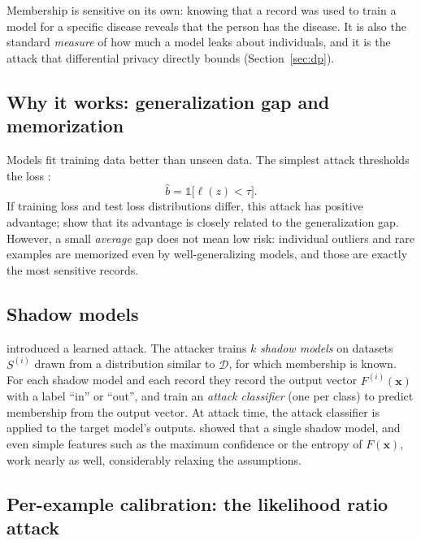 \documentclass[10pt,a4paper]{extarticle}
\theoremstyle{definition}
\newcommand{\D}{\mathcal{D}}
\newcommand{\x}{\mathbf{x}}
\begin{document}
Membership is sensitive on its own: knowing that a record was used to train a model for a specific disease reveals that the person has the disease. It is also the standard \emph{measure} of how much a model leaks about individuals, and it is the attack that differential privacy directly bounds (Section~\ref{sec:dp}).

\subsection{Why it works: generalization gap and memorization}

Models fit training data better than unseen data. The simplest attack thresholds the loss \citep{yeom2018privacy}:
\[
\hat b = \mathbb{1}\big[\ell(z) < \tau\big].
\]
If training loss and test loss distributions differ, this attack has positive advantage; \citet{yeom2018privacy} show that its advantage is closely related to the generalization gap. However, a small \emph{average} gap does not mean low risk: individual outliers and rare examples are memorized even by well-generalizing models, and those are exactly the most sensitive records.

\subsection{Shadow models}

\citet{shokri2017membership} introduced a learned attack. The attacker trains \(k\) \emph{shadow models} on datasets \(S^{(i)}\) drawn from a distribution similar to \(\D\), for which membership is known. For each shadow model and each record they record the output vector \(F^{(i)}(\x)\) with a label \enquote{in} or \enquote{out}, and train an \emph{attack classifier} (one per class) to predict membership from the output vector. At attack time, the attack classifier is applied to the target model's outputs. \citet{salem2019mlleaks} showed that a single shadow model, and even simple features such as the maximum confidence or the entropy of \(F(\x)\), work nearly as well, considerably relaxing the assumptions.

\subsection{Per-example calibration: the likelihood ratio attack}
\end{document}

